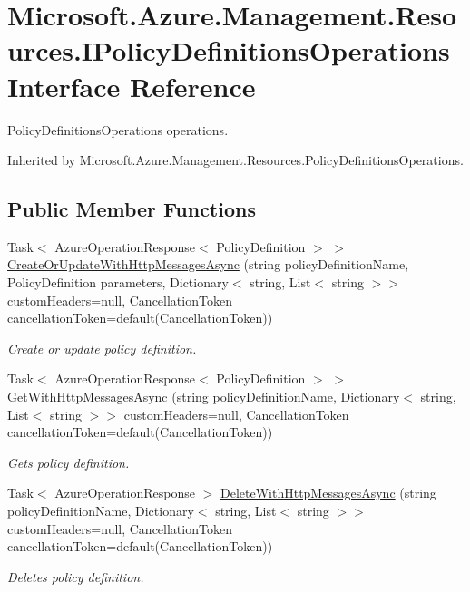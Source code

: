 \hypertarget{interface_microsoft_1_1_azure_1_1_management_1_1_resources_1_1_i_policy_definitions_operations}{}\section{Microsoft.\+Azure.\+Management.\+Resources.\+I\+Policy\+Definitions\+Operations Interface Reference}
\label{interface_microsoft_1_1_azure_1_1_management_1_1_resources_1_1_i_policy_definitions_operations}


Policy\+Definitions\+Operations operations.  




Inherited by Microsoft.\+Azure.\+Management.\+Resources.\+Policy\+Definitions\+Operations.

\subsection*{Public Member Functions}
\begin{DoxyCompactItemize}
\item 
Task$<$ Azure\+Operation\+Response$<$ Policy\+Definition $>$ $>$ \hyperlink{interface_microsoft_1_1_azure_1_1_management_1_1_resources_1_1_i_policy_definitions_operations_a582dfe92fbd288e11e8478448ce3949b}{Create\+Or\+Update\+With\+Http\+Messages\+Async} (string policy\+Definition\+Name, Policy\+Definition parameters, Dictionary$<$ string, List$<$ string $>$$>$ custom\+Headers=null, Cancellation\+Token cancellation\+Token=default(Cancellation\+Token))
\begin{DoxyCompactList}\small\item\em Create or update policy definition. \end{DoxyCompactList}\item 
Task$<$ Azure\+Operation\+Response$<$ Policy\+Definition $>$ $>$ \hyperlink{interface_microsoft_1_1_azure_1_1_management_1_1_resources_1_1_i_policy_definitions_operations_aa13da00dc909b936060f186ca51cfe1d}{Get\+With\+Http\+Messages\+Async} (string policy\+Definition\+Name, Dictionary$<$ string, List$<$ string $>$$>$ custom\+Headers=null, Cancellation\+Token cancellation\+Token=default(Cancellation\+Token))
\begin{DoxyCompactList}\small\item\em Gets policy definition. \end{DoxyCompactList}\item 
Task$<$ Azure\+Operation\+Response $>$ \hyperlink{interface_microsoft_1_1_azure_1_1_management_1_1_resources_1_1_i_policy_definitions_operations_ad6b21e52c59bb16c61abe852f563e6ca}{Delete\+With\+Http\+Messages\+Async} (string policy\+Definition\+Name, Dictionary$<$ string, List$<$ string $>$$>$ custom\+Headers=null, Cancellation\+Token cancellation\+Token=default(Cancellation\+Token))
\begin{DoxyCompactList}\small\item\em Deletes policy definition. \end{DoxyCompactList}\end{DoxyCompactItemize}


